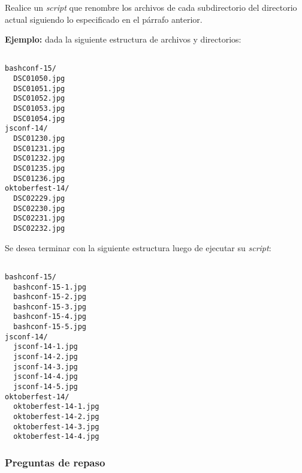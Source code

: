 \begin{questions}
Realice un \textit{script} que renombre los archivos de cada subdirectorio del directorio actual
siguiendo lo especificado en el párrafo anterior.

\textbf{Ejemplo:} dada la siguiente estructura de archivos y directorios:

\begin{lstlisting}

bashconf-15/
  DSC01050.jpg
  DSC01051.jpg
  DSC01052.jpg
  DSC01053.jpg
  DSC01054.jpg
jsconf-14/
  DSC01230.jpg
  DSC01231.jpg
  DSC01232.jpg
  DSC01235.jpg
  DSC01236.jpg
oktoberfest-14/
  DSC02229.jpg
  DSC02230.jpg
  DSC02231.jpg
  DSC02232.jpg

\end{lstlisting}

Se desea terminar con la siguiente estructura luego de ejecutar su \textit{script}:

\begin{lstlisting}

bashconf-15/
  bashconf-15-1.jpg
  bashconf-15-2.jpg
  bashconf-15-3.jpg
  bashconf-15-4.jpg
  bashconf-15-5.jpg
jsconf-14/
  jsconf-14-1.jpg
  jsconf-14-2.jpg
  jsconf-14-3.jpg
  jsconf-14-4.jpg
  jsconf-14-5.jpg
oktoberfest-14/
  oktoberfest-14-1.jpg
  oktoberfest-14-2.jpg
  oktoberfest-14-3.jpg
  oktoberfest-14-4.jpg

\end{lstlisting}

\end{questions}

\subsubsection{Preguntas de repaso}

